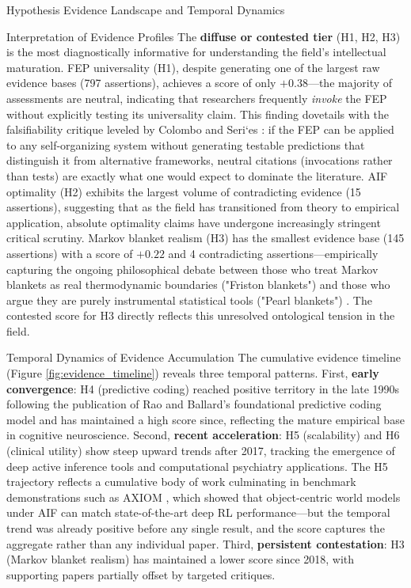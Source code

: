 \documentclass[
  ignorenonframetext,
]{beamer}
\begin{document}
\begin{frame}{Hypothesis Evidence Landscape and Temporal Dynamics
\label{sec:hypothesis_results}}
\begin{block}{Interpretation of Evidence Profiles}
The \textbf{diffuse or contested tier} (H1, H2, H3) is the most
diagnostically informative for understanding the field's intellectual
maturation. FEP universality (H1), despite generating one of the largest
raw evidence bases (797 assertions), achieves a score of only
\(+0.38\)---the majority of assessments are neutral, indicating that
researchers frequently \emph{invoke} the FEP without explicitly testing
its universality claim. This finding dovetails with the falsifiability
critique leveled by Colombo and Seri`es \citep{colombo2021free}: if the
FEP can be applied to any self-organizing system without generating
testable predictions that distinguish it from alternative frameworks,
neutral citations (invocations rather than tests) are exactly what one
would expect to dominate the literature. AIF optimality (H2) exhibits
the largest volume of contradicting evidence (15 assertions), suggesting
that as the field has transitioned from theory to empirical application,
absolute optimality claims have undergone increasingly stringent
critical scrutiny. Markov blanket realism (H3) has the smallest evidence
base (145 assertions) with a score of \(+0.22\) and 4 contradicting
assertions---empirically capturing the ongoing philosophical debate
between those who treat Markov blankets as real thermodynamic boundaries
("Friston blankets") and those who argue they are purely instrumental
statistical tools ("Pearl blankets") \citep{bruineberg2022emperor}. The
contested score for H3 directly reflects this unresolved ontological
tension in the field.
\end{block}

\begin{block}{Temporal Dynamics of Evidence Accumulation}
\protect{}\label{temporal-dynamics-of-evidence-accumulation}
The cumulative evidence timeline (Figure \ref{fig:evidence_timeline})
reveals three temporal patterns. First, \textbf{early convergence}: H4
(predictive coding) reached positive territory in the late 1990s
following the publication of Rao and Ballard's foundational predictive
coding model \citep{rao1999predictive} and has maintained a high score
since, reflecting the mature empirical base in cognitive neuroscience.
Second, \textbf{recent acceleration}: H5 (scalability) and H6 (clinical
utility) show steep upward trends after 2017, tracking the emergence of
deep active inference tools and computational psychiatry applications.
The H5 trajectory reflects a cumulative body of work culminating in
benchmark demonstrations such as AXIOM \citep{heins2025axiom}, which
showed that object-centric world models under AIF can match
state-of-the-art deep RL performance---but the temporal trend was
already positive before any single result, and the score captures the
aggregate rather than any individual paper. Third, \textbf{persistent
contestation}: H3 (Markov blanket realism) has maintained a lower score
since 2018, with supporting papers partially offset by targeted
critiques.


\end{block}
\end{frame}
\end{document}
